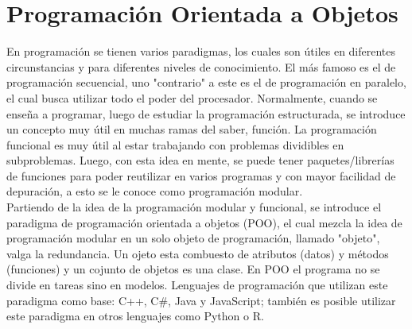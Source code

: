 \section{Programación Orientada a Objetos}

En programación se tienen varios paradigmas, los cuales son útiles en diferentes circunstancias y para diferentes niveles de conocimiento. El más famoso es el de programación secuencial, uno "contrario" a este es el de programación en paralelo, el cual busca utilizar todo el poder del procesador. Normalmente, cuando se enseña a programar, luego de estudiar la programación estructurada, se introduce un concepto muy útil en muchas ramas del saber, función. La programación funcional es muy útil al estar trabajando con problemas dividibles en subproblemas. Luego, con esta idea en mente, se puede tener paquetes/librerías de funciones para poder reutilizar en varios programas y con mayor facilidad de depuración, a esto se le conoce como programación modular. \\

Partiendo de la idea de la programación modular y funcional, se introduce el paradigma de programación orientada a objetos (POO), el cual mezcla la idea de programación modular en un solo objeto de programación, llamado "objeto", valga la redundancia. Un ojeto esta combuesto de atributos (datos) y métodos (funciones) y un cojunto de objetos es una clase. En POO el programa no se divide en tareas sino en modelos. Lenguajes de programación que utilizan este paradigma como base: C++, C\#, Java y JavaScript; también es posible utilizar este paradigma en otros lenguajes como Python o R.

